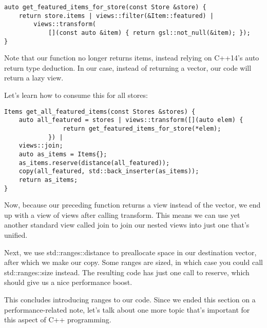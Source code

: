 \begin{lstlisting}[style=styleCXX]
auto get_featured_items_for_store(const Store &store) {
	return store.items | views::filter(&Item::featured) |
		views::transform(
			[](const auto &item) { return gsl::not_null(&item); });
}
\end{lstlisting}

Note that our function no longer returns items, instead relying on C++14's auto return type deduction. In our case, instead of returning a vector, our code will return a lazy view.

Let's learn how to consume this for all stores:

\begin{lstlisting}[style=styleCXX]
Items get_all_featured_items(const Stores &stores) {
	auto all_featured = stores | views::transform([](auto elem) {
				return get_featured_items_for_store(*elem);
			}) |
	views::join;
	auto as_items = Items{};
	as_items.reserve(distance(all_featured));
	copy(all_featured, std::back_inserter(as_items));
	return as_items;
}
\end{lstlisting}

Now, because our preceding function returns a view instead of the vector, we end up with a view of views after calling transform. This means we can use yet another standard view called join to join our nested views into just one that's unified.

Next, we use std::ranges::distance to preallocate space in our destination vector, after which we make our copy. Some ranges are sized, in which case you could call std::ranges::size instead. The resulting code has just one call to reserve, which should give us a nice performance boost.

This concludes introducing ranges to our code. Since we ended this section on a performance-related note, let's talk about one more topic that's important for this aspect of C++ programming.



